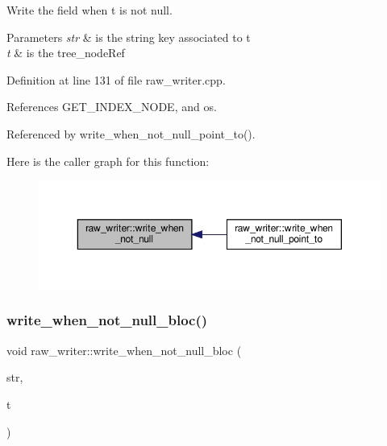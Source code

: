 Write the field when t is not null. 


\begin{DoxyParams}{Parameters}
{\em str} & is the string key associated to t \\
\hline
{\em t} & is the tree\+\_\+node\+Ref \\
\hline
\end{DoxyParams}


Definition at line 131 of file raw\+\_\+writer.\+cpp.



References G\+E\+T\+\_\+\+I\+N\+D\+E\+X\+\_\+\+N\+O\+DE, and os.



Referenced by write\+\_\+when\+\_\+not\+\_\+null\+\_\+point\+\_\+to().

Here is the caller graph for this function\+:
\nopagebreak
\begin{figure}[H]
\begin{center}
\leavevmode
\includegraphics[width=350pt]{d6/df1/structraw__writer_ace83fca22bfc78a66753b8645278a6b0_icgraph}
\end{center}
\end{figure}
\mbox{\label{structraw__writer_ad0a69a584f6faa81edfbbe6fff8a7782}} 
\subsubsection{\texorpdfstring{write\+\_\+when\+\_\+not\+\_\+null\+\_\+bloc()}{write\_when\_not\_null\_bloc()}}
{\footnotesize\ttfamily void raw\+\_\+writer\+::write\+\_\+when\+\_\+not\+\_\+null\+\_\+bloc (\begin{DoxyParamCaption}\item[{const std\+::string \&}]{str,  }\item[{const bloc\+Ref \&}]{t }\end{DoxyParamCaption})}



